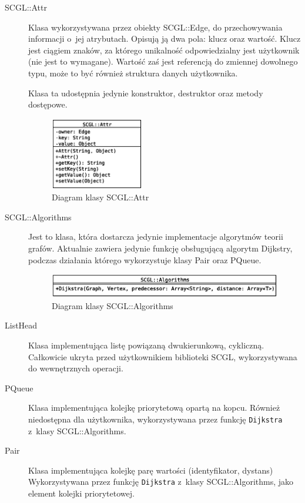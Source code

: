 \documentclass[a4paper,12pt,polish,oneside,openright]{thesis}
\newcommand\code[1]{\lstinline[style=line]{#1}}
\begin{document}
\begin{description}
	\item[SCGL::Attr]
	Klasa wykorzystywana przez obiekty SCGL::Edge, do przechowywania informacji o~jej atrybutach.
	Opisują ją dwa pola: klucz oraz wartość.
	Klucz jest ciągiem znaków, za którego unikalność odpowiedzialny jest użytkownik (nie jest to wymagane).
	Wartość zaś jest referencją do zmiennej dowolnego typu, może to być również struktura danych użytkownika.
	
	Klasa ta udostępnia jedynie konstruktor, destruktor oraz metody dostępowe.
	\begin{figure}[htb]
	\begin{center}
		\includegraphics[width=0.4\textwidth]{gfx/class_attr.eps}
		\caption{Diagram klasy SCGL::Attr}
	\end{center}
	\end{figure}

	\item[SCGL::Algorithms]
	Jest to klasa, która dostarcza jedynie implementacje algorytmów teorii grafów.
	Aktualnie zawiera jedynie funkcję obsługującą algorytm Dijkstry, podczas działania którego wykorzystuje klasy Pair oraz PQueue.
	\begin{figure}[htb]
	\begin{center}
		\includegraphics[width=1.0\textwidth]{gfx/class_algo.eps}
		\caption{Diagram klasy SCGL::Algorithms}
	\end{center}
	\end{figure}

	\item[ListHead]
	Klasa implementująca listę powiązaną dwukierunkową, cykliczną.
	Całkowicie ukryta przed użytkownikiem biblioteki SCGL, wykorzystywana do wewnętrznych operacji.

	\item[PQueue]
	Klasa implementująca kolejkę priorytetową opartą na kopcu.
	Również niedostępna dla użytkownika, wykorzystywana przez funkcję \code{Dijkstra} z~klasy SCGL::Algorithms.

	\item[Pair]
	Klasa implementująca kolejkę parę wartości (identyfikator, dystans)
	Wykorzystywana przez funkcję \code{Dijkstra} z~klasy SCGL::Algorithms, jako element kolejki priorytetowej.
\end{description}
\end{document}
